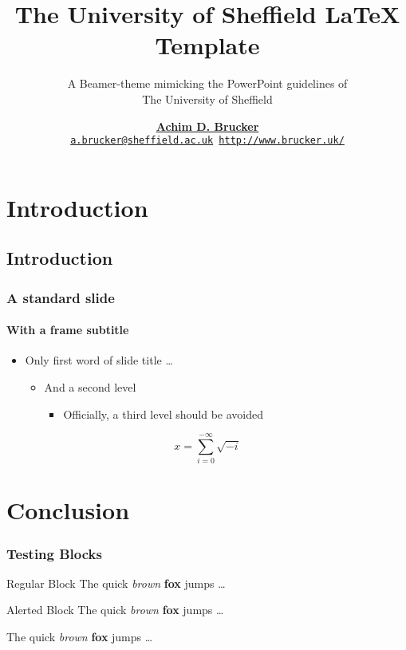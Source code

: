 \documentclass[aspectratio=169]{tuos-presentation}
\title{The University of Sheffield \LaTeX{} Template}
\subtitle{A Beamer-theme mimicking the PowerPoint guidelines of \\The
  University of Sheffield}
\institute[The University of Sheffield]
{Department of Computer Science, The University of Sheffield, Sheffield, UK}
\author[A.D. Brucker] {%
    \href{http://www.brucker.uk/}{\textbf{Achim D. Brucker}}\\
    \texttt{\footnotesize\href{mailto:"Achim D. Brucker"
        <a.brucker@sheffield.ac.uk>}{a.brucker@sheffield.ac.uk}
      \hspace{.6cm}
      \url{http://www.brucker.uk/}}
    }
\begin{document}
\begin{frame}
  \maketitle
\end{frame}

\AgendaFrame

\section{Introduction}
\subsection{Introduction}
\begin{frame}
  \frametitle{A standard slide}
  \framesubtitle{With a frame subtitle}
  \begin{itemize}
  \item Only first word of slide title \ldots
    \begin{itemize}
    \item  And a second level 
      \begin{itemize}
      \item  Officially, a third level should be avoided
      \end{itemize}
    \end{itemize}
  \end{itemize}
  \[ x = \sum_{i=0}^{-\infty}\sqrt{-i}\]
\end{frame}

\section{Conclusion}

\begin{frame}
  \frametitle{Testing Blocks}
  \begin{block}{Regular Block}
    The \alert{quick} \emph{brown} \textbf{fox} jumps \ldots  
  \end{block}

  \begin{alertblock}{Alerted Block}
    The \alert{quick} \emph{brown} \textbf{fox} jumps \ldots  
  \end{alertblock}

  \begin{Example}
    The \alert{quick} \emph{brown} \textbf{fox} jumps \ldots  
  \end{Example}

\end{frame}
\end{document}

